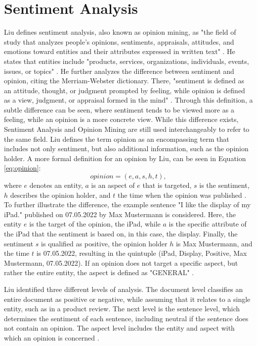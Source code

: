 \section{Sentiment Analysis}
Liu defines sentiment analysis, also known as opinion mining, as "the field of study that analyzes people's opinions, sentiments, appraisals, attitudes, and emotions toward entities and their attributes expressed in written text" \cite[p.~1]{liu_2015}. He states that entities include "products, services, organizations, individuals, events, issues, or topics" \cite[p.~1]{liu_2015}. He further analyzes the difference between sentiment and opinion, citing the Merriam-Webster dictionary. There, "sentiment is defined as an attitude, thought, or judgment prompted by feeling, while opinion is defined as a view, judgment, or appraisal formed in the mind" \cite[p.~2]{liu_2015}. Through this definition, a subtle difference can be seen, where sentiment tends to be viewed more as a feeling, while an opinion is a more concrete view. While this difference exists, Sentiment Analysis and Opinion Mining are still used interchangeably to refer to the same field. Liu defines the term opinion as an encompassing term that includes not only sentiment, but also additional information, such as the opinion holder. A more formal definition for an opinion by Liu, can be seen in Equation \eqref{eq:opinion}:
\begin{equation}
    opinion = (e, a, s, h, t),
    \label{eq:opinion}
\end{equation}
where $e$ denotes an entity, $a$ is an aspect of $e$ that is targeted, $s$ is the sentiment, $h$ describes the opinion holder, and $t$ the time when the opinion was published \cite{liu_2015}. To further illustrate the difference, the example sentence "I like the display of my iPad." published on 07.05.2022 by Max Mustermann is considered. Here, the entity $e$ is the target of the opinion, the iPad, while $a$ is the specific attribute of the iPad that the sentiment is based on, in this case, the display. Finally, the sentiment $s$ is qualified as positive, the opinion holder $h$ is Max Mustermann, and the time $t$ is 07.05.2022, resulting in the quintuple (iPad, Display, Positive, Max Mustermann, 07.05.2022). If an opinion does not target a specific aspect, but rather the entire entity, the aspect is defined as "GENERAL" \cite{liu_2015}. 


Liu identified three different levels of analysis. The document level classifies an entire document as positive or negative, while assuming that it relates to a single entity, such as in a product review. The next level is the sentence level, which determines the sentiment of each sentence, including neutral if the sentence does not contain an opinion. The aspect level includes the entity and aspect with which an opinion is concerned \cite{liu_2015}.

